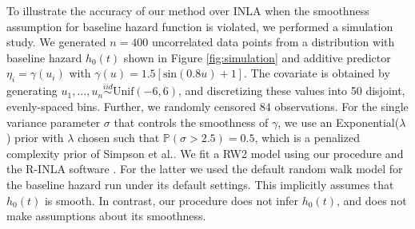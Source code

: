\documentclass[serif,10pt]{wiley-article}
\begin{document}
To illustrate the accuracy of our method over INLA when the smoothness assumption for baseline hazard function is violated, we performed a simulation study. We generated $n = 400$ uncorrelated data points from a distribution with baseline hazard $h_{0}(t)$ shown in Figure \ref{fig:simulation} and additive predictor $\eta_{i} = \gamma(u_{i})$ with $\gamma(u) = 1.5 [ \text{sin}(0.8u) + 1 ]$. The covariate is obtained by generating $u_{1},\ldots,u_{n}\overset{iid}{\sim}\text{Unif}(-6,6)$, and discretizing these values into 50 disjoint, evenly-spaced bins. Further, we randomly censored $84$ observations. For the single variance parameter $\sigma$ that controls the smoothness of $\gamma$, we use an Exponential($\lambda$) prior with $\lambda$ chosen such that $\mathbb{P}\left( \sigma > 2.5\right) = 0.5$, which is a penalized complexity prior of Simpson et al.\cite{pcprior}. We fit a RW2 model using our procedure and the R-INLA software \cite{inla}. For the latter we used the default random walk model for the baseline hazard run under its default settings. This implicitly assumes that $h_{0}(t)$ is smooth. In contrast, our procedure does not infer $h_{0}(t)$, and does not make assumptions about its smoothness.
\end{document}
